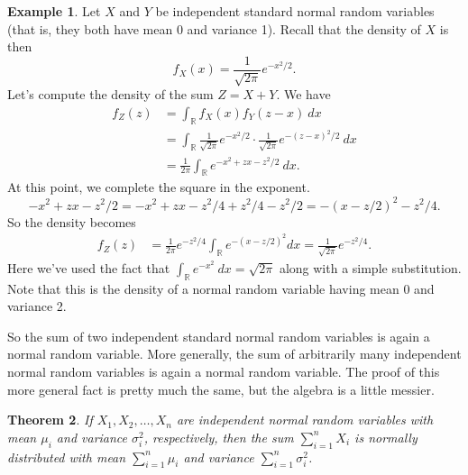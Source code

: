 \documentclass[12pt]{article}
\theoremstyle{plain}
\newtheorem{theorem}{Theorem}[section]
\theoremstyle{definition}
\newtheorem{example}[theorem]{Example}
\theoremstyle{remark}
\newcommand{\R}{\mathbb{R}}
\begin{document}
\begin{example}
    Let $X$ and $Y$ be independent standard normal random variables (that is, they both have mean 0 and variance 1).
    Recall that the density of $X$ is then
    \[
        f_X(x) = \frac{1}{\sqrt{2\pi}}e^{-x^2/2}.
    \]
    Let's compute the density of the sum $Z = X+Y$.
    We have
    \begin{align*}
        f_Z(z) &= \int_\R f_X(x)f_Y(z-x)\ dx\\
        &= \int_\R \frac{1}{\sqrt{2\pi}}e^{-x^2/2}\cdot \frac{1}{\sqrt{2\pi}}e^{-(z-x)^2/2}\ dx\\
        &= \frac{1}{2\pi}\int_\R e^{-x^2 + zx - z^2/2}\ dx.
    \end{align*}
    At this point, we complete the square in the exponent.
    \[
        -x^2 + zx - z^2/2 = -x^2 + zx -z^2/4 + z^2/4 - z^2/2 = -(x-z/2)^2 - z^2/4.
    \]
    So the density becomes
    \begin{align*}
        f_Z(z) &= \frac{1}{2\pi}e^{-z^2/4}\int_\R e^{-(x-z/2)^2}dx = \frac{1}{\sqrt{2\pi}}e^{-z^2/4}.
    \end{align*}
    Here we've used the fact that $\int_\R e^{-x^2}\ dx = \sqrt{2\pi}$ along with a simple substitution.
    Note that this is the density of a normal random variable having mean 0 and variance 2.
\end{example}

So the sum of two independent standard normal random variables is again a normal random variable.
More generally, the sum of arbitrarily many independent normal random variables is again a normal random variable.
The proof of this more general fact is pretty much the same, but the algebra is a little messier.

\begin{theorem}
    If $X_1, X_2, \ldots, X_n$ are independent normal random variables with mean $\mu_i$ and variance $\sigma_i^2$, respectively, then the sum $\sum_{i=1}^nX_i$ is normally distributed with mean $\sum_{i=1}^n\mu_i$ and variance $\sum_{i=1}^n\sigma_i^2$.
\end{theorem}
\end{document}
